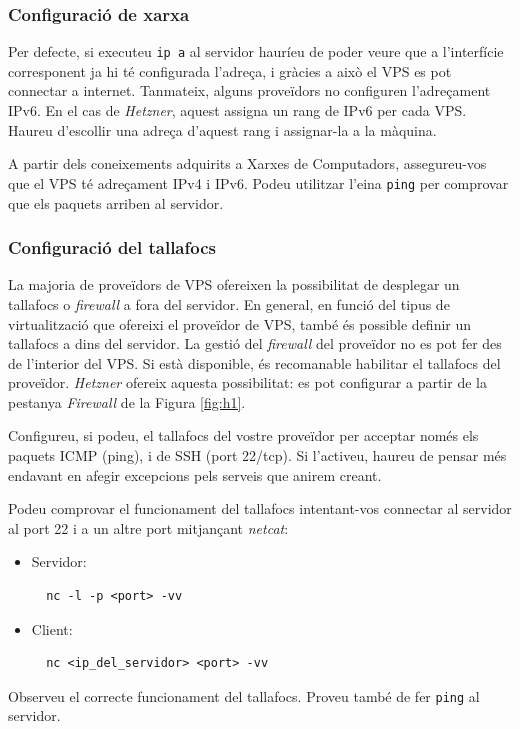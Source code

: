 \documentclass{practicaitic}
\begin{document}
\subsubsection{Configuració de xarxa}

Per defecte, si executeu \texttt{ip a} al servidor hauríeu de poder veure
que a l'interfície corresponent ja hi té configurada l'adreça, i gràcies a
això el VPS es pot connectar a internet. Tanmateix, alguns proveïdors no configuren
l'adreçament IPv6. En el cas de \textit{Hetzner}, aquest assigna un rang de IPv6
per cada VPS. Haureu d'escollir una adreça d'aquest rang i assignar-la a la màquina.

\begin{previ}
A partir dels coneixements adquirits a Xarxes de Computadors, assegureu-vos
que el VPS té adreçament IPv4 i IPv6. Podeu utilitzar l'eina \texttt{ping} per comprovar
que els paquets arriben al servidor.
\end{previ}

\subsubsection{Configuració del tallafocs}


La majoria de proveïdors de VPS ofereixen la possibilitat de desplegar
un tallafocs o \textit{firewall} a fora del servidor. En general, en
funció del tipus de virtualització que ofereixi el proveïdor de VPS,
també és possible definir un tallafocs a dins del servidor. La gestió
del \textit{firewall} del proveïdor no es pot fer des de l'interior
del VPS. Si està disponible, és recomanable habilitar el tallafocs del
proveïdor. \textit{Hetzner} ofereix aquesta possibilitat: es pot
configurar a partir de la pestanya \textit{Firewall} de la Figura
\ref{fig:h1}.

\begin{previ}
Configureu, si podeu, el tallafocs del vostre proveïdor per acceptar només
els paquets ICMP (ping), i de SSH (port 22/tcp). Si l'activeu, haureu de pensar més endavant en
afegir excepcions pels serveis que anirem creant.

Podeu comprovar el funcionament del tallafocs intentant-vos connectar al
servidor al port 22 i a un altre port mitjançant \textit{netcat}:
\begin{itemize}
\item Servidor:
\begin{verbatim}
  nc -l -p <port> -vv
\end{verbatim}
\item Client:
\begin{verbatim}
  nc <ip_del_servidor> <port> -vv
\end{verbatim}
\end{itemize}
  
Observeu el correcte funcionament del tallafocs. Proveu també de fer
\texttt{ping} al servidor.
\end{previ}
\end{document}
